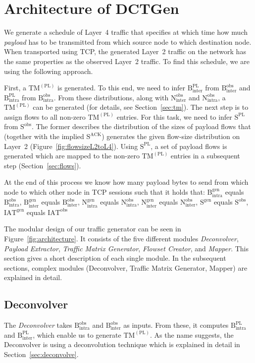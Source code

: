 \documentclass[journal,10pt]{IEEEtran}
\newcommand{\genname}{DCTGen}
\newcommand{\lt}{Layer~2}
\newcommand{\pltm}{\ensuremath{\mathrm{TM}^{(\mathrm{PL})}}}
\newcommand{\bytes}[2]{\ensuremath{\mathrm{B}^{\mathrm{#1}}_{\mathrm{#2}}}}
\newcommand{\partners}[2]{\ensuremath{\mathrm{N}^{\mathrm{#1}}_{\mathrm{#2}}}}
\newcommand{\iat}[1] {\ensuremath{\mathrm{IAT}^{\mathrm{#1}}}}
\newcommand{\size}[1]{\ensuremath{\mathrm{S}  ^{\mathrm{#1}}}}
\begin{document}
\section{Architecture of \genname{}}
\label{sec:architecture}

We generate a schedule of Layer~4 traffic
that specifies at which time how much \emph{payload} has to be transmitted from which source node to which destination node.
When transported using TCP, the generated \lt{} traffic on the network has the same properties as the observed \lt{} traffic.
To find this schedule, we are using the following approach.

		
First, a \pltm{} is generated.
To this end, we need to infer \bytes{PL}{inter} from \bytes{obs}{inter} and \bytes{PL}{intra} from \bytes{obs}{intra}.
From these distributions, along with \partners{obs}{inter} and \partners{obs}{intra}, a \pltm{} can be generated (for details, see Section~\ref{sec:tm}).
The next step is to assign flows to all non-zero \pltm{} entries.
For this task, we need to infer \size{PL} from \size{obs}.
The former describes the distribution of
the sizes of payload flows that (together with the implied \size{ACK}) generates the given flow-size distribution on Layer~2
(Figure~\ref{fig:flowsizeL2toL4}).
Using \size{PL}, a set of payload flows is generated which are mapped to the non-zero \pltm{} entries in a subsequent step (Section~\ref{sec:flows}).

At the end of this process we know how many payload bytes to send from which node to which other node in TCP sessions such 
that it holds that: 
\bytes{gen}{intra} equals \bytes{obs}{intra}, 
\bytes{gen}{inter} equals \bytes{obs}{inter},
\partners{gen}{intra} equals \partners{obs}{intra},
\partners{gen}{inter} equals \partners{obs}{inter},
\size{gen} equals \size{obs},
\iat{gen} equals \iat{obs}


The modular design of our traffic generator can be seen in Figure~\ref{fig:architecture}. It consists of the five different modules
\emph{Deconvolver}, 
\emph{Payload Extractor},
\emph{Traffic Matrix Generator},
\emph{Flowset Creator}, and 
\emph{Mapper}.
This section gives a short description of each single module. In the subsequent sections, complex modules 
(Deconvolver, Traffic Matrix Generator, Mapper) are explained in detail.

\subsection{Deconvolver}
The \emph{Deconvolver} takes \bytes{obs}{intra} and \bytes{obs}{inter} as inputs.
From these, it computes \bytes{PL}{intra} and \bytes{PL}{inter},
which enable us to generate \pltm{}.
As the name suggests, the Deconvolver is using a deconvolution technique which is explained in detail in Section~\ref{sec:deconvolve}.
\end{document}
